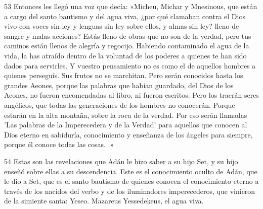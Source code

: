 \par 53 Entonces les llegó una voz que decía: «Micheu, Michar y Mnesinous, que están a cargo del santo bautismo y del agua viva, ¿por qué clamaban contra el Dios vivo con voces sin ley y lenguas sin ley sobre ellos, y almas sin ley? lleno de sangre y malas acciones? Estás lleno de obras que no son de la verdad, pero tus caminos están llenos de alegría y regocijo. Habiendo contaminado el agua de la vida, la has atraído dentro de la voluntad de los poderes a quienes te han sido dados para servirles. Y vuestro pensamiento no es como el de aquellos hombres a quienes perseguís. Sus frutos no se marchitan. Pero serán conocidos hasta los grandes Aeones, porque las palabras que habían guardado, del Dios de los Aeones, no fueron encomendadas al libro, ni fueron escritos. Pero los traerán seres angélicos, que todas las generaciones de los hombres no conocerán. Porque estarán en la alta montaña, sobre la roca de la verdad. Por eso serán llamadas 'Las palabras de la Imperecedera y de la Verdad' para aquellos que conocen al Dios eterno en sabiduría, conocimiento y enseñanza de los ángeles para siempre, porque él conoce todas las cosas. .»

\par 54 Estas son las revelaciones que Adán le hizo saber a su hijo Set, y su hijo enseñó sobre ellas a su descendencia. Este es el conocimiento oculto de Adán, que le dio a Set, que es el santo bautismo de quienes conocen el conocimiento eterno a través de los nacidos del verbo y de los iluminadores imperecederos, que vinieron de la simiente santa: Yeseo. Mazareus Yessedekeus, el agua viva.



